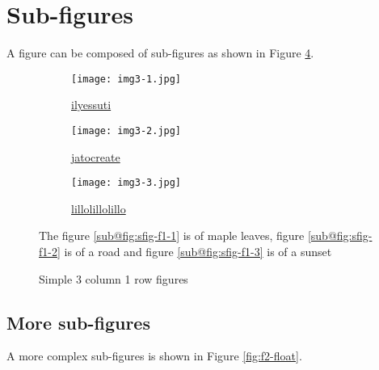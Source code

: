 
\section{Sub-figures}

A figure can be composed of sub-figures as shown in Figure \ref{fig:f1-float}.

\begin{figure}
    \centering
    \begin{subfigure}[b]{0.3\textwidth}
        \centering
        \texttt{[image: img3-1.jpg]}
        \caption[Maple Leaves]{\href{https://pixabay.com/photos/maple-maple-leaves-raindrops-6290891/}{ilyessuti}}
        \label{fig:sfig-f1-1}
    \end{subfigure}
    \hfill
    \begin{subfigure}[b]{0.3\textwidth}
        \centering
        \texttt{[image: img3-2.jpg]}
        \caption[Road]{\href{https://pixabay.com/photos/road-landscape-autumn-highway-fall-6745746/}{jatocreate}}
        \label{fig:sfig-f1-2}
    \end{subfigure}
    \hfill
    \begin{subfigure}[b]{0.3\textwidth}
        \centering
        \texttt{[image: img3-3.jpg]}
        \caption[Sunset]{\href{https://pixabay.com/photos/sunset-beach-sea-waves-shore-sand-6387462/}{lillolillolillo}}
        \label{fig:sfig-f1-3}
    \end{subfigure}
    \caption[Sub-Figures]{Simple 3 column 1 row figures}
    \label{fig:f1-float}
    \small
        The figure \ref{sub@fig:sfig-f1-1} is of maple leaves, figure \ref{sub@fig:sfig-f1-2} is of a road and figure \ref{sub@fig:sfig-f1-3} is of a sunset
\end{figure}

\subsection{More sub-figures}
A more complex sub-figures is shown in Figure \ref{fig:f2-float}.

